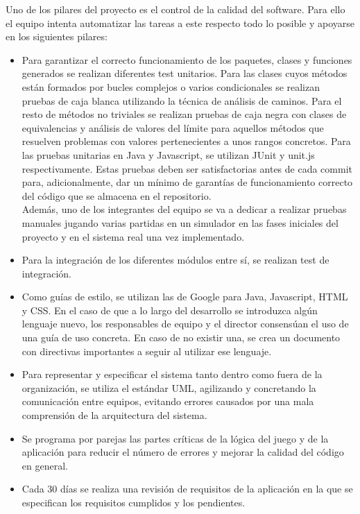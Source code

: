 Uno de los pilares del proyecto es el control de la calidad del software. Para ello el equipo intenta automatizar las tareas a este respecto todo lo posible y apoyarse en los siguientes pilares:
\begin{itemize}
\item{Para garantizar el correcto funcionamiento de los paquetes, clases y funciones generados se realizan diferentes test unitarios. Para las clases cuyos métodos están formados por bucles complejos o varios condicionales se realizan pruebas de caja blanca utilizando la técnica de análisis de caminos. Para el resto de métodos no triviales se realizan pruebas de caja negra con clases de equivalencias y análisis de valores del límite para aquellos métodos que resuelven problemas con valores pertenecientes a unos rangos concretos. Para las pruebas unitarias en Java y Javascript, se utilizan JUnit y unit.js respectivamente. Estas pruebas deben ser satisfactorias antes de cada commit para, adicionalmente, dar un mínimo de garantías de funcionamiento correcto del código que se almacena en el repositorio.\\ Además, uno de los integrantes del equipo se va a dedicar a realizar pruebas manuales jugando varias partidas en un simulador en las fases iniciales del proyecto y en el sistema real una vez implementado.}
\item{Para la integración de los diferentes módulos entre sí, se realizan test de integración.}
\item{Como guías de estilo, se utilizan las de Google para Java, Javascript, HTML y CSS. En el caso de que a lo largo del desarrollo se introduzca algún lenguaje nuevo, los responsables de equipo y el director consensúan el uso de una guía de uso concreta. En caso de no existir una, se crea un documento con directivas importantes a seguir al utilizar ese lenguaje.}
\item{Para representar y especificar el sistema tanto dentro como fuera de la organización, se utiliza el estándar UML, agilizando y concretando la comunicación entre equipos, evitando errores causados por una mala comprensión de la arquitectura del sistema.}
\item{Se programa por parejas las partes críticas de la lógica del juego y de la aplicación para reducir el número de errores y mejorar la calidad del código en general.}
\item{Cada 30 días se realiza una revisión de requisitos de la aplicación en la que se especifican los requisitos cumplidos y los pendientes.}
\end{itemize}
